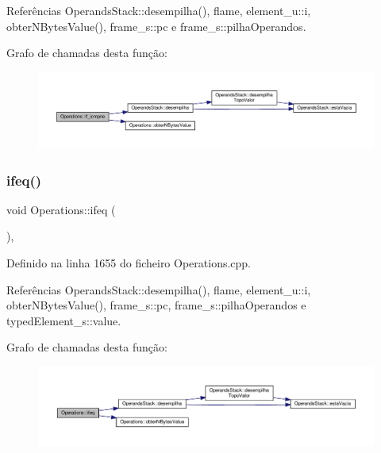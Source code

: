 Referências Operands\+Stack\+::desempilha(), flame, element\+\_\+u\+::i, obter\+N\+Bytes\+Value(), frame\+\_\+s\+::pc e frame\+\_\+s\+::pilha\+Operandos.

Grafo de chamadas desta função\+:
\nopagebreak
\begin{figure}[H]
\begin{center}
\leavevmode
\includegraphics[width=350pt]{classOperations_a52dca630766e37bbaf0e7439c0335273_cgraph}
\end{center}
\end{figure}
\mbox{\label{classOperations_ad33c8bdb5f67bdbf0885bb51990f99ee}} 
\subsubsection{\texorpdfstring{ifeq()}{ifeq()}}
{\footnotesize\ttfamily void Operations\+::ifeq (\begin{DoxyParamCaption}{ }\end{DoxyParamCaption})\hspace{0.3cm}{\ttfamily [static]}, {\ttfamily [private]}}



Definido na linha 1655 do ficheiro Operations.\+cpp.



Referências Operands\+Stack\+::desempilha(), flame, element\+\_\+u\+::i, obter\+N\+Bytes\+Value(), frame\+\_\+s\+::pc, frame\+\_\+s\+::pilha\+Operandos e typed\+Element\+\_\+s\+::value.

Grafo de chamadas desta função\+:
\nopagebreak
\begin{figure}[H]
\begin{center}
\leavevmode
\includegraphics[width=350pt]{classOperations_ad33c8bdb5f67bdbf0885bb51990f99ee_cgraph}
\end{center}
\end{figure}
\mbox{\label{classOperations_a0e7cf2111ad25ee52aa329cc6ec4d38a}} 
